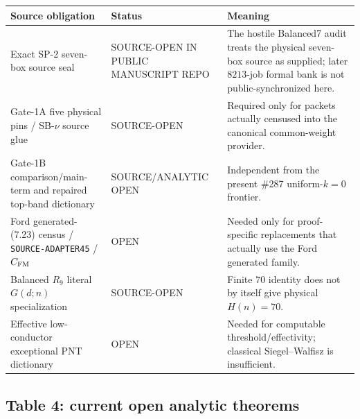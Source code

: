 \documentclass[11pt]{article}
\theoremstyle{definition}
\newcommand{\1}{\mathbf 1}
\newcommand{\status}[1]{\textsf{#1}}
\begin{document}
\begin{center}
\scriptsize
\renewcommand{\arraystretch}{1.16}
\begin{tabularx}{\textwidth}{>{\raggedright\arraybackslash}p{}
>{\raggedright\arraybackslash}p{}X}
\toprule
Source obligation & Status & Meaning\\
\midrule
Exact SP-2 seven-box source seal &
\status{SOURCE-OPEN IN PUBLIC MANUSCRIPT REPO} &
The hostile Balanced7 audit treats the physical seven-box source as supplied; later
$8213$-job formal bank is not public-synchronized here.\\
Gate-1A five physical pins / SB-$\nu$ source glue &
\status{SOURCE-OPEN} &
Required only for packets actually censused into the canonical common-weight provider.\\
Gate-1B comparison/main-term and repaired top-band dictionary &
\status{SOURCE/ANALYTIC OPEN} &
Independent from the present \#287 uniform-$k=0$ frontier.\\
Ford generated-(7.23) census / \texttt{SOURCE-ADAPTER45} / $C_{\rm FM}$ &
\status{OPEN} &
Needed only for proof-specific replacements that actually use the Ford generated family.\\
Balanced $R_9$ literal $G(d;n)$ specialization &
\status{SOURCE-OPEN} &
Finite $70$ identity does not by itself give physical $H(n)=70$.\\
Effective low-conductor exceptional PNT dictionary &
\status{OPEN} &
Needed for computable threshold/effectivity; classical Siegel--Walfisz is insufficient.\\
\bottomrule
\end{tabularx}
\end{center}

\subsection{Table 4: current open analytic theorems}
\end{document}
